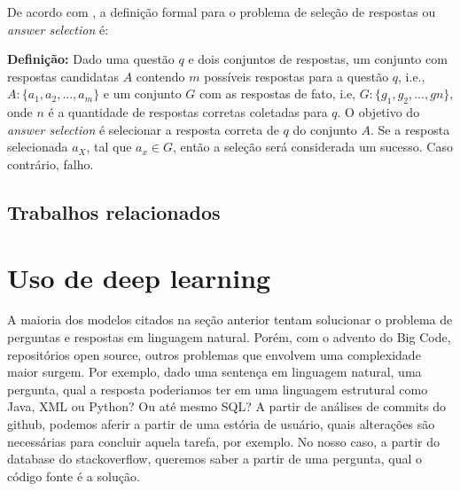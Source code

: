 De acordo com \cite{shao-answer-selection:2019}, a definição formal para o problema de seleção de respostas ou \textit{answer selection} é:

\textbf{Definição:} Dado uma questão $q$ e dois conjuntos de respostas, um conjunto com respostas candidatas $A$ contendo $m$ possíveis respostas para a questão $q$, i.e., $A : \{ a_{1}, a_{2}, . . ., a_{m}\}$ e um conjunto $G$ com as respostas de fato, i.e, $G : \{ g_{1}, g_{2}, . . ., g{n}\}$, onde $n$ é a quantidade de respostas corretas coletadas para $q$. O objetivo do \textit{answer selection} é selecionar a resposta correta de $q$ do conjunto $A$. Se a resposta selecionada $a_{X}$, tal que $a_{x} \in G$, então a seleção será considerada um sucesso. Caso contrário, falho.

\subsection{Trabalhos relacionados}\label{sec:answer-selection-trabalhos-relacionados}

\section{Uso de deep learning}
\label{sec:uso-deep-learning}

A maioria dos modelos citados na seção anterior tentam solucionar o problema de perguntas e respostas em linguagem natural. Porém, com o advento do Big Code, repositórios open source, outros problemas que envolvem uma complexidade maior surgem. Por exemplo, dado uma sentença em linguagem natural, uma pergunta, qual a resposta poderiamos ter em uma linguagem estrutural como Java, XML ou Python? Ou até mesmo SQL? A partir de análises de commits do github, podemos aferir a partir de uma estória de usuário, quais alterações são necessárias para concluir aquela tarefa, por exemplo. No nosso caso, a partir do database do stackoverflow, queremos saber a partir de uma pergunta, qual o código fonte é a solução.